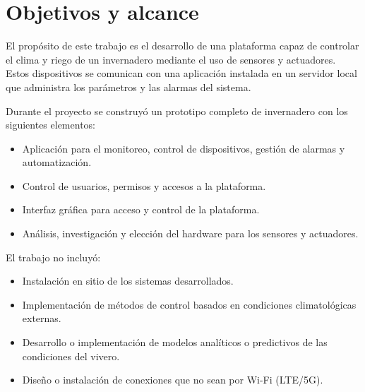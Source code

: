 
\section{Objetivos y alcance}


El propósito de este trabajo es el desarrollo de una plataforma capaz de controlar el clima y riego de un invernadero mediante el uso de sensores y actuadores. Estos dispositivos se comunican con una aplicación instalada en un servidor local que administra los parámetros y las alarmas del sistema.

Durante el proyecto se construyó un prototipo completo de invernadero con los siguientes elementos:
 
\begin{itemize}
	\item Aplicación para el monitoreo, control de dispositivos, gestión de alarmas y automatización.
	\item Control de usuarios, permisos y accesos a la plataforma.
	\item Interfaz gráfica para acceso y control de la plataforma.
	\item Análisis, investigación y elección del hardware para los sensores y actuadores.


\end{itemize}


El trabajo no incluyó:
\begin{itemize}
	\item Instalación en sitio de los sistemas desarrollados.
	\item Implementación de métodos de control basados en condiciones climatológicas externas.
	\item Desarrollo o implementación de modelos analíticos o predictivos de las condiciones del vivero.
	\item Diseño o instalación de conexiones que no sean por Wi-Fi (LTE/5G). 
	
\end{itemize}